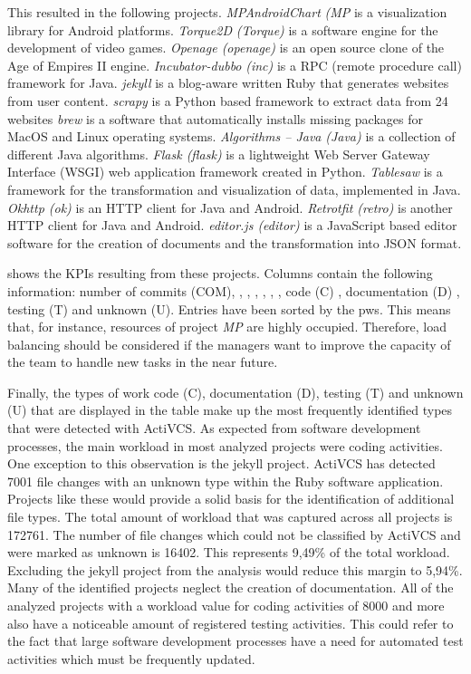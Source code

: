 This resulted in the following projects. 
\textsl{MPAndroidChart} \textsl{(MP} is a visualization library for Android platforms. 
\textsl{Torque2D} \textsl{(Torque)} is a software engine for the development of video games. 
\textsl{Openage (openage)}	is an open source clone of the Age of Empires II engine. 
\textsl{Incubator-dubbo} \textsl{(inc)}	is a RPC (remote procedure call) framework for Java. \textsl{jekyll}	is a blog-aware written Ruby that generates websites from user content. \textsl{scrapy} is a Python based framework to extract data from 24 websites
\textsl{brew} is a software that automatically installs missing packages for MacOS and Linux operating systems. 
\textsl{Algorithms -- Java} \textsl{(Java)} is a collection of different Java algorithms. 
\textsl{Flask (flask)} is a lightweight Web Server Gateway Interface (WSGI) web application framework created in Python. 
\textsl{Tablesaw} is a framework for the transformation and visualization of data, implemented in Java.
\textsl{Okhttp (ok)} is an HTTP client for Java and Android. 
\textsl{Retrotfit (retro)}	is another HTTP client for Java and Android.
\textsl{editor.js (editor)}	is a JavaScript based editor software for the creation of documents and the transformation into JSON format.



 shows the KPIs resulting from these projects. Columns contain the following information: number of commits (COM), , , , , , , code (C) , documentation (D) , testing (T) and unknown (U). Entries have been sorted by the \gls{pws}.  This means that, for instance, resources of project \textsl{MP} are highly occupied. Therefore, load balancing should be considered if the managers want to improve the capacity of the team to handle new tasks in the near future. 

Finally, the types of work code (C), documentation (D), testing (T) and unknown (U) that are displayed in the table make up the most frequently identified types that were detected with ActiVCS. As expected from software development processes, the main workload in most analyzed projects were coding activities.
One exception to this observation is the jekyll project. ActiVCS has detected
7001 file changes with an unknown type within the Ruby software application. Projects like these would provide a solid basis for the identification of
additional file types. The total amount of workload that was captured across all projects is 172761. The number of file changes which could not be classified by ActiVCS and were marked as unknown is 16402. This represents 9,49\% of the total workload. Excluding the jekyll project from the analysis would reduce this margin to 5,94\%. Many of the identified projects neglect the creation of documentation.
All of the analyzed projects with a workload value for coding activities of
8000 and more also have a noticeable amount of registered testing activities.
This could refer to the fact that large software development processes
have a need for automated test activities which must be frequently updated.
